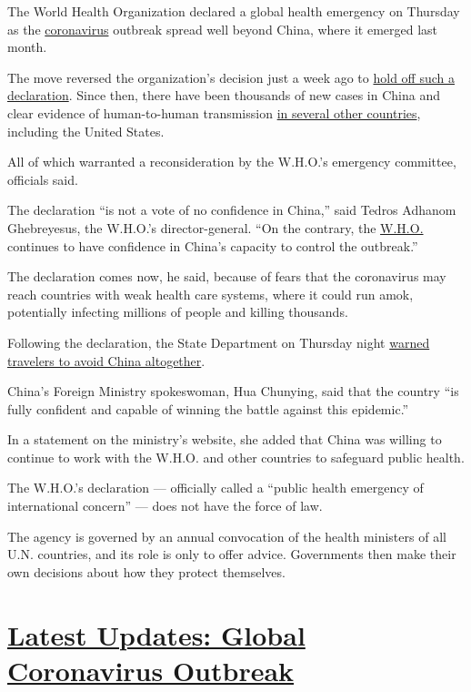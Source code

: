 The World Health Organization declared a global health emergency on
Thursday as the
\href{https://www.nytimes.com/2020/04/16/health/WHO-Trump-coronavirus.html}{coronavirus}
outbreak spread well beyond China, where it emerged last month.

The move reversed the organization's decision just a week ago to
\href{https://www.nytimes.com/2020/01/23/health/china-virus-who-emergency.html}{hold
off such a declaration}. Since then, there have been thousands of new
cases in China and clear evidence of human-to-human transmission
\href{https://www.nytimes.com/2020/01/29/health/china-coronavirus-outbreak.html}{in
several other countries}, including the United States.

All of which warranted a reconsideration by the W.H.O.'s emergency
committee, officials said.

The declaration ``is not a vote of no confidence in China,'' said Tedros
Adhanom Ghebreyesus, the W.H.O.'s director-general. ``On the contrary,
the
\href{https://www.nytimes.com/2020/04/16/health/WHO-Trump-coronavirus.html}{W.H.O.}
continues to have confidence in China's capacity to control the
outbreak.''

The declaration comes now, he said, because of fears that the
coronavirus may reach countries with weak health care systems, where it
could run amok, potentially infecting millions of people and killing
thousands.

Following the declaration, the State Department on Thursday night
\href{https://travel.state.gov/content/travel/en/traveladvisories/traveladvisories/china-travel-advisory.html}{warned
travelers to avoid China altogether}.

China's Foreign Ministry spokeswoman, Hua Chunying, said that the
country ``is fully confident and capable of winning the battle against
this epidemic.''

In a statement on the ministry's website, she added that China was
willing to continue to work with the W.H.O. and other countries to
safeguard public health.

The W.H.O.'s declaration --- officially called a ``public health
emergency of international concern'' --- does not have the force of law.

The agency is governed by an annual convocation of the health ministers
of all U.N. countries, and its role is only to offer advice. Governments
then make their own decisions about how they protect themselves.

\hypertarget{latest-updates-global-coronavirus-outbreak}{%
\section{\texorpdfstring{\href{https://www.nytimes.com/2020/08/01/world/coronavirus-covid-19.html?action=click\&pgtype=Article\&state=default\&region=MAIN_CONTENT_1\&context=storylines_live_updates}{Latest
Updates: Global Coronavirus
Outbreak}}{Latest Updates: Global Coronavirus Outbreak}}\label{latest-updates-global-coronavirus-outbreak}}

